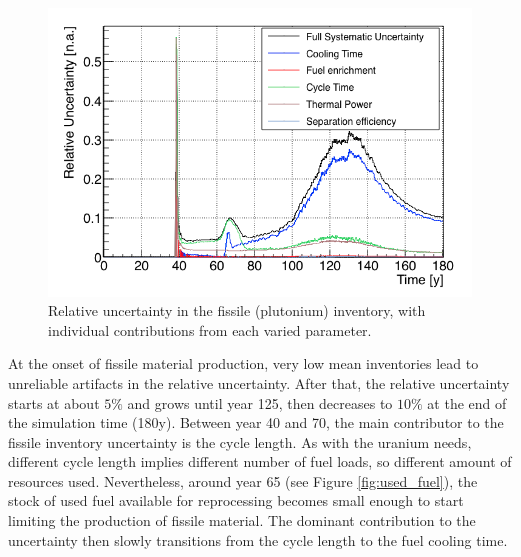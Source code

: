 \documentclass{anstrans}
\begin{document}
\begin{figure}[t] %
    \centering
    \includegraphics[scale=0.3]{pu_uncer}
    \caption{Relative uncertainty in the fissile (plutonium) inventory, with
      individual contributions from each varied parameter.}\label{fig:pu_uncer}
\end{figure}

At the onset of fissile material production, very low mean inventories lead to
unreliable artifacts in the relative uncertainty.
After that, the relative uncertainty
starts at about $5\%$ and grows until year
125, then decreases to $10\%$ at the end of the simulation time (180y).  
Between year 40 and 70, the main contributor to the fissile inventory
uncertainty is the cycle length.  As with the uranium needs, different cycle length
implies different number of fuel loads, so different amount of resources used.  Nevertheless, around year 65 (see Figure
\ref{fig:used_fuel}), the stock of used fuel available for reprocessing becomes
small enough to start limiting the production of fissile material.
The dominant contribution to the uncertainty then slowly transitions from
the cycle length to the fuel cooling time.
\end{document}
